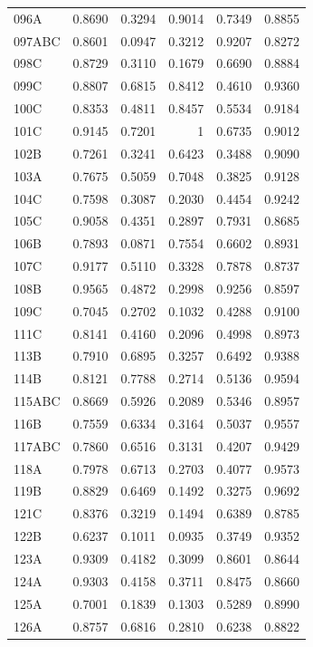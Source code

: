 \begin{longtable}{lrrrrr}
  096A & 0.8690 & 0.3294 & 0.9014 & 0.7349 & 0.8855 \\
  097ABC & 0.8601 & 0.0947 & 0.3212 & 0.9207 & 0.8272 \\
  098C & 0.8729 & 0.3110 & 0.1679 & 0.6690 & 0.8884 \\
  099C & 0.8807 & 0.6815 & 0.8412 & 0.4610 & 0.9360 \\
  100C & 0.8353 & 0.4811 & 0.8457 & 0.5534 & 0.9184 \\
  101C & 0.9145 & 0.7201 & 1 & 0.6735 & 0.9012 \\
  102B & 0.7261 & 0.3241 & 0.6423 & 0.3488 & 0.9090 \\
  103A & 0.7675 & 0.5059 & 0.7048 & 0.3825 & 0.9128 \\
  104C & 0.7598 & 0.3087 & 0.2030 & 0.4454 & 0.9242 \\
  105C & 0.9058 & 0.4351 & 0.2897 & 0.7931 & 0.8685 \\
  106B & 0.7893 & 0.0871 & 0.7554 & 0.6602 & 0.8931 \\
  107C & 0.9177 & 0.5110 & 0.3328 & 0.7878 & 0.8737 \\
  108B & 0.9565 & 0.4872 & 0.2998 & 0.9256 & 0.8597 \\
  109C & 0.7045 & 0.2702 & 0.1032 & 0.4288 & 0.9100 \\
  111C  & 0.8141 & 0.4160 & 0.2096 & 0.4998 & 0.8973 \\
  113B & 0.7910 & 0.6895 & 0.3257 & 0.6492 & 0.9388 \\
  114B & 0.8121 & 0.7788 & 0.2714 & 0.5136 & 0.9594 \\
  115ABC & 0.8669 & 0.5926 & 0.2089 & 0.5346 & 0.8957 \\
  116B & 0.7559 & 0.6334 & 0.3164 & 0.5037 & 0.9557 \\
  117ABC & 0.7860 & 0.6516 & 0.3131 & 0.4207 & 0.9429 \\
  118A & 0.7978 & 0.6713 & 0.2703 & 0.4077 & 0.9573 \\
  119B & 0.8829 & 0.6469 & 0.1492 & 0.3275 & 0.9692 \\
  121C & 0.8376 & 0.3219 & 0.1494 & 0.6389 & 0.8785 \\
  122B & 0.6237 & 0.1011 & 0.0935 & 0.3749 & 0.9352 \\
  123A & 0.9309 & 0.4182 & 0.3099 & 0.8601 & 0.8644 \\
  124A & 0.9303 & 0.4158 & 0.3711 & 0.8475 & 0.8660 \\
  125A & 0.7001 & 0.1839 & 0.1303 & 0.5289 & 0.8990 \\
  126A & 0.8757 & 0.6816 & 0.2810 & 0.6238 & 0.8822 \\

\end{longtable}
